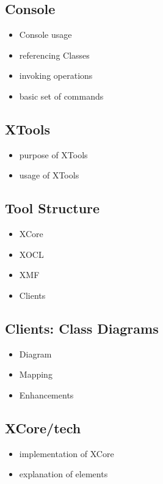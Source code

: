 \documentclass[10pt,a4paper]{report}
\begin{document}
\subsection{Console}
\label{sub:Console}
\begin{itemize}
\item Console usage
\item referencing Classes
\item invoking operations
\item basic set of commands
\end{itemize}

\subsection{XTools}
\label{sub:XTools}
\begin{itemize}
\item purpose of XTools
\item usage of XTools
\end{itemize}

\subsection{Tool Structure}
\label{sub:Tool Structure}
\begin{itemize}
\item XCore
\item XOCL
\item XMF
\item Clients
\end{itemize}

\subsection{Clients: Class Diagrams}
\label{sub:Clients: Class Diagrams}
\begin{itemize}
\item Diagram
\item Mapping
\item Enhancements
\end{itemize}

\subsection{XCore/tech}
\label{sub:XCore/tech}
\begin{itemize}
\item implementation of XCore
\item explanation of elements
\end{itemize}
\end{document}
